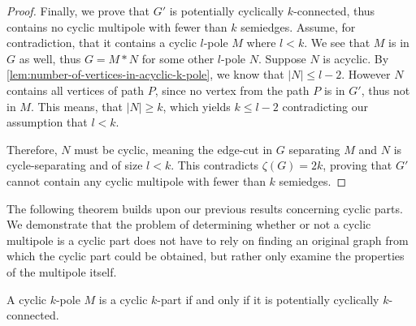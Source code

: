 \documentclass[12pt, twoside]{book}
\begin{document}
\begin{proof}
	Finally, we prove that $G'$ is potentially cyclically $k$-connected, thus contains no cyclic multipole with fewer than $k$ semiedges. Assume, for contradiction, that it contains a cyclic $l$-pole $M$ where $l<k$. We see that $M$ is in $G$ as well, thus $G=M*N$ for some other $l$-pole $N$. Suppose $N$ is acyclic. By \cref{lem:number-of-vertices-in-acyclic-k-pole}, we know that $|N|\leq l-2$. However $N$ contains all vertices of path $P$, since no vertex from the path $P$ is in $G'$, thus not in $M$. This means, that $|N|\geq k$, which yields $k\leq l-2$ contradicting our assumption that $l<k$.
	
	Therefore, $N$ must be cyclic, meaning the edge-cut in $G$ separating $M$ and $N$ is cycle-separating and of size $l<k$. This contradicts $\zeta(G)=2k$, proving that $G'$ cannot contain any cyclic multipole with fewer than $k$ semiedges.
\end{proof}


The following theorem builds upon our previous results concerning cyclic parts. We demonstrate that the problem of determining whether or not a cyclic multipole is a cyclic part does not have to rely on finding an original graph from which the cyclic part could be obtained, but rather only examine the properties of the multipole itself.

\begin{theorem}\label{th:alternative-definition-of-cyclic-part}
	A cyclic $k$-pole $M$ is a cyclic $k$-part if and only if it is potentially cyclically $k$-connected.
\end{theorem}
\end{document}
